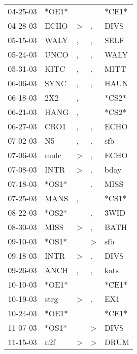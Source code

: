 \begin{supertabular}{lllll}
 04-25-03 &  *OE1* &                  &                  &  *CE1* \\
 04-28-03 &   ECHO &     \textgreater &                , &   DIVS \\
 05-15-03 &   WALY &                , &                , &   SELF \\
 05-24-03 &   UNCO &                , &                , &   WALY \\
 05-31-03 &   KITC &                , &                , &   MITT \\
 06-06-03 &   SYNC &                , &                , &   HAUN \\
 06-18-03 &    2X2 &                , &                  &  *CS2* \\
 06-21-03 &   HANG &                , &                  &  *CS2* \\
 06-27-03 &   CRO1 &                , &                , &   ECHO \\
 07-02-03 &     N5 &                , &                , &    sfb \\
 07-06-03 &   mulc &     \textgreater &                , &   ECHO \\
 07-08-03 &   INTR &     \textgreater &                , &   bday \\
 07-18-03 &  *OS1* &                  &                , &   MISS \\
 07-25-03 &   MANS &                , &                  &  *CS1* \\
 08-22-03 &  *OS2* &                  &                , &   3WID \\
 08-30-03 &   MISS &     \textgreater &                , &   BATH \\
 09-10-03 &  *OS1* &                  &     \textgreater &    sfb \\
 09-18-03 &   INTR &     \textgreater &                , &   DIVS \\
 09-26-03 &   ANCH &                , &                , &   kats \\
 10-10-03 &  *OE1* &                  &                  &  *CE1* \\
 10-19-03 &   strg &     \textgreater &                , &    EX1 \\
 10-24-03 &  *OE1* &                  &                  &  *CE1* \\
 11-07-03 &  *OS1* &                  &     \textgreater &   DIVS \\
 11-15-03 &    n2f &     \textgreater &     \textgreater &   DRUM \\

\end{supertabular}
